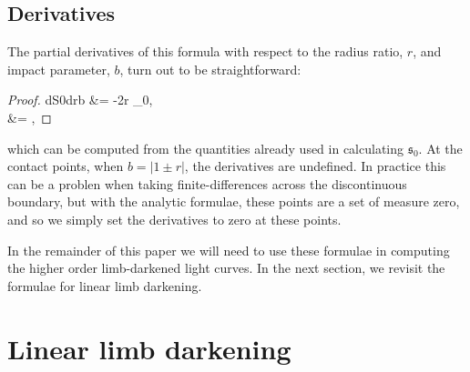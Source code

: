 \documentclass[modern]{aastex61}
\begin{document}
\subsection{Derivatives}

The partial derivatives of this formula with respect to the radius
ratio, $r$, and impact parameter, $b$, turn out to be straightforward:
\begin{proof}{dS0drb}\label{eq:dS0_drb}
 &= -2r \kappa_0,\nonumber\\
 &= ,
\end{proof}
which can be computed from the quantities already used in calculating $\mathfrak{s}_0$.
At the contact points, when $b = \vert 1\pm r\vert$, the derivatives are undefined.
In practice this can be a problen when taking finite-differences across
the discontinuous boundary, but with the analytic formulae, these points
are a set of measure zero, and so we simply set the derivatives to zero
at these points.

In the remainder of this paper we will need to use these formulae in computing
the higher order limb-darkened light curves.  In the next section, we revisit the formulae
for linear limb darkening.

\section{Linear limb darkening}
\label{sec:reparam}
\end{document}
